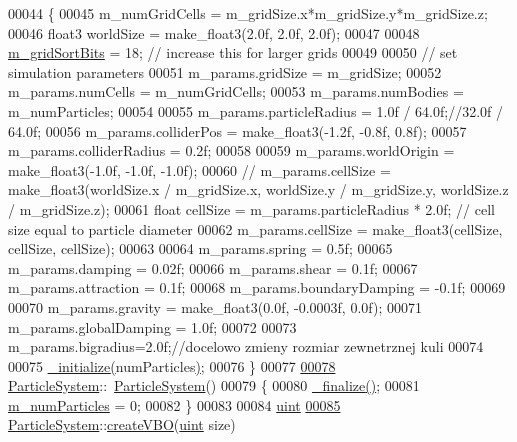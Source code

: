 \begin{DoxyCode}
00044 \{
00045     m\_numGridCells = m\_gridSize.x*m\_gridSize.y*m\_gridSize.z;
00046     float3 worldSize = make\_float3(2.0f, 2.0f, 2.0f);
00047 
00048     \hyperlink{class_particle_system_a2a0452a32993337176d88fa2fbe63020}{m\_gridSortBits} = 18;    \textcolor{comment}{// increase this for larger grids}
00049 
00050     \textcolor{comment}{// set simulation parameters}
00051     m\_params.gridSize = m\_gridSize;
00052     m\_params.numCells = m\_numGridCells;
00053     m\_params.numBodies = m\_numParticles;
00054 
00055     m\_params.particleRadius = 1.0f / 64.0f;\textcolor{comment}{//32.0f / 64.0f;}
00056     m\_params.colliderPos = make\_float3(-1.2f, -0.8f, 0.8f);
00057     m\_params.colliderRadius = 0.2f;
00058 
00059     m\_params.worldOrigin = make\_float3(-1.0f, -1.0f, -1.0f);
00060     \textcolor{comment}{//    m\_params.cellSize = make\_float3(worldSize.x / m\_gridSize.x, worldSize.y / m\_gridSize.y,
       worldSize.z / m\_gridSize.z);}
00061     \textcolor{keywordtype}{float} cellSize = m\_params.particleRadius * 2.0f;  \textcolor{comment}{// cell size equal to particle diameter}
00062     m\_params.cellSize = make\_float3(cellSize, cellSize, cellSize);
00063 
00064     m\_params.spring = 0.5f;
00065     m\_params.damping = 0.02f;
00066     m\_params.shear = 0.1f;
00067     m\_params.attraction = 0.1f;
00068     m\_params.boundaryDamping = -0.1f;
00069 
00070     m\_params.gravity = make\_float3(0.0f, -0.0003f, 0.0f);
00071     m\_params.globalDamping = 1.0f;
00072 
00073         m\_params.bigradius=2.0f;\textcolor{comment}{//docelowo zmieny rozmiar zewnetrznej kuli}
00074 
00075     \hyperlink{class_particle_system_a484988642e046424d32a13709204e8de}{\_initialize}\hyperlink{class_particle_system_a484988642e046424d32a13709204e8de}{(}numParticles\hyperlink{class_particle_system_a484988642e046424d32a13709204e8de}{)};
00076 \}
00077 
\hypertarget{particle_system_8cpp_source_l00078}{}\hyperlink{class_particle_system_a6bc725349a763b9d6817950cde16a93f}{00078} \hyperlink{class_particle_system}{ParticleSystem}::~\hyperlink{class_particle_system_a6bc725349a763b9d6817950cde16a93f}{ParticleSystem}()
00079 \{
00080     \hyperlink{class_particle_system_a5d6a52db7d1277c8fe734ecceb69e5c6}{\_finalize}\hyperlink{class_particle_system_a5d6a52db7d1277c8fe734ecceb69e5c6}{(}\hyperlink{class_particle_system_a5d6a52db7d1277c8fe734ecceb69e5c6}{)};
00081     \hyperlink{class_particle_system_a23d238efa80a647d4b6cde034f486a91}{m\_numParticles} = 0;
00082 \}
00083 
00084 \hyperlink{particles__kernel_8cuh_a91ad9478d81a7aaf2593e8d9c3d06a14}{uint}
\hypertarget{particle_system_8cpp_source_l00085}{}\hyperlink{class_particle_system_a399eb5cb9c422fd3370899e4d8a5d62e}{00085} \hyperlink{class_particle_system}{ParticleSystem}::\hyperlink{class_particle_system_a399eb5cb9c422fd3370899e4d8a5d62e}{createVBO}(\hyperlink{particles__kernel_8cuh_a91ad9478d81a7aaf2593e8d9c3d06a14}{uint} size)

\end{DoxyCode}
